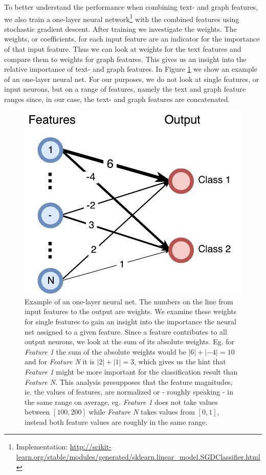 To better understand the performance when combining text- and graph features, we also train a one-layer neural network\footnote{Implementation: \url{http://scikit-learn.org/stable/modules/generated/sklearn.linear_model.SGDClassifier.html}} with the combined features using stochastic gradient descent. After training we investigate the weights.
The weights, or coefficients, for each input feature are an indicator for the importance of that input feature.
Thus we can look at weights for the text features and compare them to weights for graph features.
This gives us an insight into the relative importance of text- and graph features.
In Figure \ref{fig:coefs_example_one_layer} we show an example of an one-layer neural net.
For our purposes, we do not look at single features, or input neurons, but on a range of features, namely the text and graph feature ranges since, in our case, the text- and graph features are concatenated.

\begin{figure}[htb!]
	\centering
	{\includegraphics[width=0.5\linewidth]{assets/figures/coefs_example.pdf}%
		\caption[Example: One-layer neural net]{%
			Example of an one-layer neural net. The numbers on the line from input features to the output are weights.
			We examine these weights for single features to gain an insight into the importance the neural net assigned to a given feature. Since a feature contributes to all output neurons, we look at the sum of its absolute weights. Eg. for \textit{Feature 1} the sum of the absolute weights would be $|6| + |-4| = 10$ and for \textit{Feature N} it is $|2| + |1| = 3$, which gives us the hint that \textit{Feature 1} might be more important for the classification result than \textit{Feature N}.
			This analysis presupposes that the feature magnitudes, ie. the values of features, are normalized or - roughly speaking - in the same range on average, eg. \textit{Feature 1} does not take values between $[100, 200]$ while \textit{Feature N} takes values from $[0, 1]$, instead both feature values are roughly in the same range.
		}%
		\label{fig:coefs_example_one_layer}}
\end{figure}

